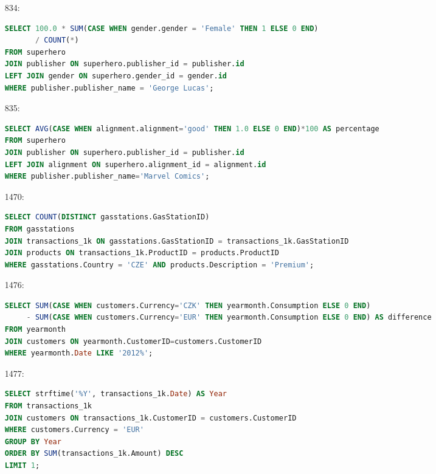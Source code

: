 \documentclass[11pt]{article}
\begin{document}
\begin{enumerate}
\item[834:]
\begin{lstlisting}[language=SQL]
SELECT 100.0 * SUM(CASE WHEN gender.gender = 'Female' THEN 1 ELSE 0 END)
       / COUNT(*)
FROM superhero
JOIN publisher ON superhero.publisher_id = publisher.id
LEFT JOIN gender ON superhero.gender_id = gender.id
WHERE publisher.publisher_name = 'George Lucas';
\end{lstlisting}

\item[835:]
\begin{adjustbox}{max width=\textwidth}
\begin{lstlisting}[language=SQL]
SELECT AVG(CASE WHEN alignment.alignment='good' THEN 1.0 ELSE 0 END)*100 AS percentage
FROM superhero
JOIN publisher ON superhero.publisher_id = publisher.id
LEFT JOIN alignment ON superhero.alignment_id = alignment.id
WHERE publisher.publisher_name='Marvel Comics';
\end{lstlisting}
\end{adjustbox}

\item[1470:]
\begin{adjustbox}{max width=\textwidth}
\begin{lstlisting}[language=SQL]
SELECT COUNT(DISTINCT gasstations.GasStationID)
FROM gasstations
JOIN transactions_1k ON gasstations.GasStationID = transactions_1k.GasStationID
JOIN products ON transactions_1k.ProductID = products.ProductID
WHERE gasstations.Country = 'CZE' AND products.Description = 'Premium';
\end{lstlisting}
\end{adjustbox}

\item[1476:]
\begin{adjustbox}{max width=\textwidth}
\begin{lstlisting}[language=SQL]
SELECT SUM(CASE WHEN customers.Currency='CZK' THEN yearmonth.Consumption ELSE 0 END)
     - SUM(CASE WHEN customers.Currency='EUR' THEN yearmonth.Consumption ELSE 0 END) AS difference
FROM yearmonth
JOIN customers ON yearmonth.CustomerID=customers.CustomerID
WHERE yearmonth.Date LIKE '2012%';
\end{lstlisting}
\end{adjustbox}

\item[1477:]
\begin{lstlisting}[language=SQL]
SELECT strftime('%Y', transactions_1k.Date) AS Year
FROM transactions_1k
JOIN customers ON transactions_1k.CustomerID = customers.CustomerID
WHERE customers.Currency = 'EUR'
GROUP BY Year
ORDER BY SUM(transactions_1k.Amount) DESC
LIMIT 1;
\end{lstlisting}


\end{enumerate}
\end{document}
